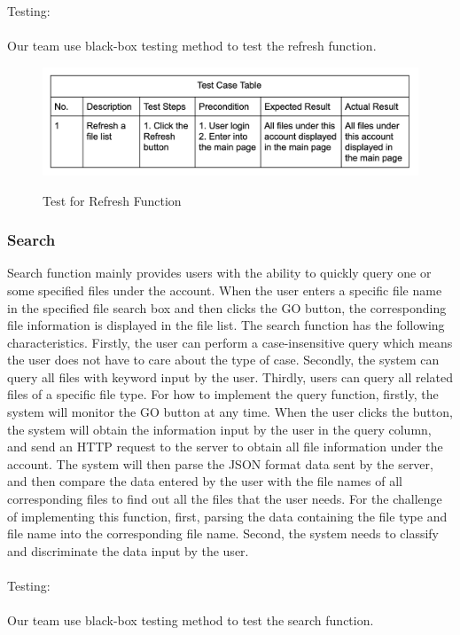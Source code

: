 \documentclass[11pt]{article}
\begin{document}
Testing:
\\
\\
Our team use black-box testing method to test the refresh function.
\begin{figure}[htbp]
	\centering
	\includegraphics[width=12cm]{2.png}\\
	\caption{Test for Refresh Function}
\end{figure}

\subsubsection{Search}
Search function mainly provides users with the ability to quickly query one or some specified files under the account. When the user enters a specific file name in the specified file search box and then clicks the GO button, the corresponding file information is displayed in the file list. The search function has the following characteristics. Firstly, the user can perform a case-insensitive query which means the user does not have to care about the type of case. Secondly, the system can query all files with keyword input by the user. Thirdly, users can query all related files of a specific file type. For how to implement the query function, firstly, the system will monitor the GO button at any time. When the user clicks the button, the system will obtain the information input by the user in the query column, and send an HTTP request to the server to obtain all file information under the account. The system will then parse the JSON format data sent by the server, and then compare the data entered by the user with the file names of all corresponding files to find out all the files that the user needs. For the challenge of implementing this function, first, parsing the data containing the file type and file name into the corresponding file name. Second, the system needs to classify and discriminate the data input by the user. 
\\
\\
Testing:
\\
\\
Our team use black-box testing method to test the search function.
\end{document}

